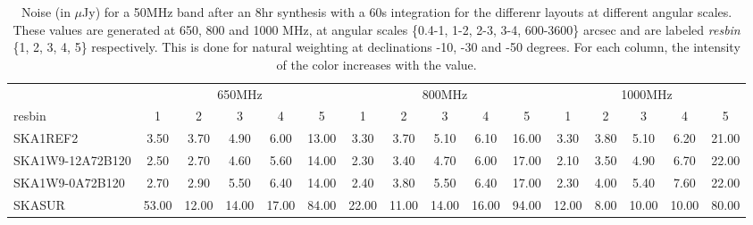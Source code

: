 \begin{table}[!htp]
{{\begin{tabular}{|lccccc||ccccc||ccccc|}
 \tabularnewline \cline{2-16} \multicolumn{1}{c}{ } & \multicolumn{5}{|c}{650MHz}  & \multicolumn{5}{c}{800MHz}  & \multicolumn{5}{c|}{1000MHz} \tabularnewline \cline{1-16} 
 resbin  &1 & 2 & 3 & 4 & 5 & 1 & 2 & 3 & 4 & 5 & 1 & 2 & 3 & 4 & 5 \tabularnewline \hline
SKA1REF2 & 3.50 \cellcolor{blue!18.83} & 3.70 \cellcolor{red!22.52} & 4.90 \cellcolor{green!19.34} & 6.00 \cellcolor{orange!19.47} & 13.00 \cellcolor{purple!18.00} & 3.30 \cellcolor{blue!20.13} & 3.70 \cellcolor{red!19.66} & 5.10 \cellcolor{green!19.81} & 6.10 \cellcolor{orange!18.42} & 16.00 \cellcolor{purple!18.00} & 3.30 \cellcolor{blue!23.09} & 3.80 \cellcolor{red!20.80} & 5.10 \cellcolor{green!19.65} & 6.20 \cellcolor{orange!18.00} & 21.00 \cellcolor{purple!18.00}\\ \hline 
SKA1W9-12A72B120 & 2.50 \cellcolor{blue!18.00} & 2.70 \cellcolor{red!18.00} & 4.60 \cellcolor{green!18.00} & 5.60 \cellcolor{orange!18.00} & 14.00 \cellcolor{purple!18.59} & 2.30 \cellcolor{blue!18.00} & 3.40 \cellcolor{red!18.00} & 4.70 \cellcolor{green!18.00} & 6.00 \cellcolor{orange!18.00} & 17.00 \cellcolor{purple!18.54} & 2.10 \cellcolor{blue!18.00} & 3.50 \cellcolor{red!18.00} & 4.90 \cellcolor{green!18.00} & 6.70 \cellcolor{orange!23.53} & 22.00 \cellcolor{purple!18.71}\\ \hline 
SKA1W9-0A72B120 & 2.70 \cellcolor{blue!18.17} & 2.90 \cellcolor{red!18.90} & 5.50 \cellcolor{green!22.02} & 6.40 \cellcolor{orange!20.95} & 14.00 \cellcolor{purple!18.59} & 2.40 \cellcolor{blue!18.21} & 3.80 \cellcolor{red!20.21} & 5.50 \cellcolor{green!21.61} & 6.40 \cellcolor{orange!19.68} & 17.00 \cellcolor{purple!18.54} & 2.30 \cellcolor{blue!18.85} & 4.00 \cellcolor{red!22.67} & 5.40 \cellcolor{green!22.12} & 7.60 \cellcolor{orange!33.47} & 22.00 \cellcolor{purple!18.71}\\ \hline 
SKASUR & 53.00 \cellcolor{blue!60.00} & 12.00 \cellcolor{red!60.00} & 14.00 \cellcolor{green!60.00} & 17.00 \cellcolor{orange!60.00} & 84.00 \cellcolor{purple!60.00} & 22.00 \cellcolor{blue!60.00} & 11.00 \cellcolor{red!60.00} & 14.00 \cellcolor{green!60.00} & 16.00 \cellcolor{orange!60.00} & 94.00 \cellcolor{purple!60.00} & 12.00 \cellcolor{blue!60.00} & 8.00 \cellcolor{red!60.00} & 10.00 \cellcolor{green!60.00} & 10.00 \cellcolor{orange!60.00} & 80.00 \cellcolor{purple!60.00}\tabularnewline \hline 
\end{tabular}}\hfil 

\caption{Noise (in $\mu$Jy) for a 50MHz band after an 8hr synthesis with a 60s integration for the differenr layouts at different angular scales. These values are generated at 650, 800 and 1000 MHz, at angular scales \{0.4-1, 1-2, 2-3, 3-4, 600-3600\} arcsec and are labeled {\it resbin} \{1, 2, 3, 4, 5\} respectively. This is done for natural weighting at declinations -10, -30 and -50 degrees. For each column, the intensity of the color increases with the value.}\label{tab:noise50-band1}}
 \end{table}